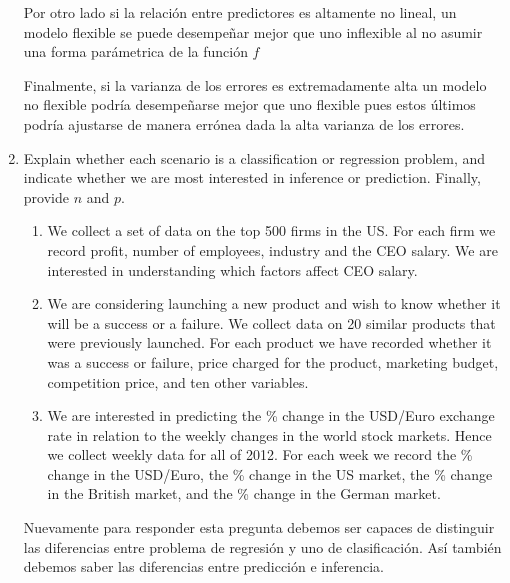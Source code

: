 \documentclass[a4paper,11pt]{article}
\begin{document}
\begin{enumerate}
{\begin{shaded}
            Por otro lado si la relación entre predictores es 
            altamente no lineal, un modelo flexible se puede 
            desempeñar mejor que uno inflexible al no asumir una 
            forma parámetrica de la función $f$
            
            Finalmente, si la varianza de los errores es 
            extremadamente alta un modelo no flexible podría 
            desempeñarse mejor que uno flexible pues estos 
            últimos podría ajustarse de manera errónea dada la 
            alta varianza de los errores.
        \end{shaded}
}
        \item Explain whether each scenario is a classiﬁcation 
        or regression problem, and indicate whether we are most 
        interested in inference or prediction. Finally, provide
        $n$ and $p$.
        \begin{enumerate}
            \item We collect a set of data on the top 500 ﬁrms 
            in the US. For each ﬁrm we record proﬁt, number of 
            employees, industry and the CEO salary. We are 
            interested in understanding which factors affect CEO 
            salary.
            \item We are considering launching a new product and 
            wish to know whether it will be a success or a 
            failure. We collect data on 20 similar products that 
            were previously launched. For each product we have 
            recorded whether it was a success or failure, price
            charged for the product, marketing budget, 
            competition price, and ten other variables.
            \item We are interested in predicting the \% change 
            in the USD/Euro exchange rate in relation to the 
            weekly changes in the world stock markets. Hence we 
            collect weekly data for all of 2012. For each week 
            we record the \% change in the USD/Euro, the \%
            change in the US market, the \% change in the
            British market, and the \% change in the German
            market.
        \end{enumerate}
{\sl
        \begin{shaded}
        Nuevamente para responder esta pregunta debemos ser 
        capaces de distinguir las diferencias entre problema de 
        regresión y uno de clasificación. Así también debemos 
        saber las diferencias entre predicción e inferencia. 

\end{shaded}}
\end{enumerate}
\end{document}

